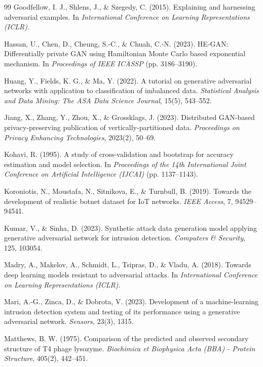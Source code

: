 \documentclass[11pt, a4paper]{article}
\begin{document}
\begin{thebibliography}{99}
Goodfellow, I. J., Shlens, J., \& Szegedy, C. (2015). Explaining and harnessing adversarial examples. In \textit{International Conference on Learning Representations (ICLR)}.

Hassan, U., Chen, D., Cheung, S.-C., \& Chuah, C.-N. (2023). HE-GAN: Differentially private GAN using Hamiltonian Monte Carlo based exponential mechanism. In \textit{Proceedings of IEEE ICASSP} (pp. 3186--3190).

Huang, Y., Fields, K. G., \& Ma, Y. (2022). A tutorial on generative adversarial networks with application to classification of imbalanced data. \textit{Statistical Analysis and Data Mining: The ASA Data Science Journal}, 15(5), 543--552.

Jiang, X., Zhang, Y., Zhou, X., \& Grossklags, J. (2023). Distributed GAN-based privacy-preserving publication of vertically-partitioned data. \textit{Proceedings on Privacy Enhancing Technologies}, 2023(2), 50--69.

Kohavi, R. (1995). A study of cross-validation and bootstrap for accuracy estimation and model selection. In \textit{Proceedings of the 14th International Joint Conference on Artificial Intelligence (IJCAI)} (pp. 1137--1143).

Koroniotis, N., Moustafa, N., Sitnikova, E., \& Turnbull, B. (2019). Towards the development of realistic botnet dataset for IoT networks. \textit{IEEE Access}, 7, 94529--94541.

Kumar, V., \& Sinha, D. (2023). Synthetic attack data generation model applying generative adversarial network for intrusion detection. \textit{Computers \& Security}, 125, 103054.

Madry, A., Makelov, A., Schmidt, L., Tsipras, D., \& Vladu, A. (2018). Towards deep learning models resistant to adversarial attacks. In \textit{International Conference on Learning Representations (ICLR)}.

Mari, A.-G., Zinca, D., \& Dobrota, V. (2023). Development of a machine-learning intrusion detection system and testing of its performance using a generative adversarial network. \textit{Sensors}, 23(3), 1315.

Matthews, B. W. (1975). Comparison of the predicted and observed secondary structure of T4 phage lysozyme. \textit{Biochimica et Biophysica Acta (BBA) - Protein Structure}, 405(2), 442--451.


\end{thebibliography}
\end{document}
